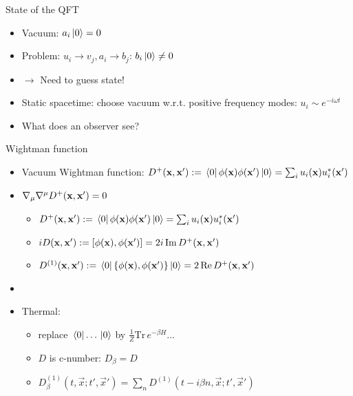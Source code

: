 \documentclass{beamer}
\renewcommand{\va}[1]{\vec{#1}}
\begin{document}
\begin{frame}{State of the QFT}
\begin{itemize}
	\item Vacuum: \(a_i \ket*{0} = 0\)
	\item Problem: \(u_i \to v_j, a_i \to b_j\): \(b_i \ket*{0} \neq 0\)
	\item[] \(\to\) Need to guess state!
	\item Static spacetime: choose vacuum w.r.t. positive frequency modes: \(u_i \sim e^{-i\omega t}\)
	\item What does an observer see? 
\end{itemize}
\end{frame}

\begin{frame}{Wightman function\cite{davies}}
\begin{itemize}
	\item Vacuum Wightman function: \(D^+(\vb{x},\vb{x}') := \bra*{0}\phi(\vb{x})\phi(\vb{x}')\ket*{0} = \sum_i u_i(\vb{x}) u_i^*(\vb{x}')\)
	\item \(\nabla_\mu\nabla^\mu D^+(\vb{x},\vb{x}') = 0\)
	\begin{itemize}
		\item  \(D^+(\vb{x},\vb{x}') := \bra*{0}\phi(\vb{x})\phi(\vb{x}')\ket*{0} = \sum_i u_i(\vb{x}) u_i^*(\vb{x}')\)
 		\item \(i D(\vb{x},\vb{x}') := [\phi(\vb{x}),\phi(\vb{x}')] = 2i\,\mathrm{Im}\,D^+(\vb{x},\vb{x}')\)
		\item \(D^{(1)}(\vb{x},\vb{x}') := \bra*{0}\{\phi(\vb{x}),\phi(\vb{x}')\}\ket*{0}= 2\,\mathrm{Re}\,D^+(\vb{x},\vb{x}')\)
	\end{itemize}
	\item[]
	\item Thermal:
	\begin{itemize}
		\item replace \(\bra*{0}\dots\ket*{0}\) by \(\frac{1}{Z} \mathrm{Tr}\,e^{-\beta H} \dots\)
		\item \(D\) is c-number: \(D_\beta = D\)
		\item \(D^{(1)}_\beta(t,\va{x};t',\va{x}') = \sum_n D^{(1)}(t-i\beta n, \va{x};t',\va{x}')\)
	\end{itemize}
\end{itemize}
\end{frame}
\end{document}
